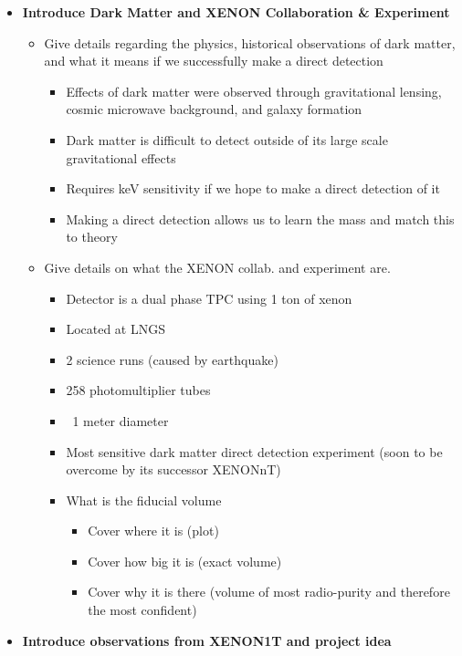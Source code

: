 \documentclass[12pt]{article}
\author{}
\date{}
\begin{document}
	\begin{itemize}
		\item \textbf{Introduce Dark Matter and XENON Collaboration \& Experiment}
			\begin{itemize}
				\item Give details regarding the physics, historical observations of dark matter, and what it means if we successfully make a direct detection
					\begin{itemize}
						\item Effects of dark matter were observed through gravitational lensing, cosmic microwave background, and galaxy formation
						\item Dark matter is difficult to detect outside of its large scale gravitational effects
						\item Requires keV sensitivity if we hope to make a direct detection of it
						\item Making a direct detection allows us to learn the mass and match this to theory
					\end{itemize}
				\item Give details on what the XENON collab. and experiment are.
					\begin{itemize}
						\item Detector is a dual phase TPC using 1 ton of xenon
						\item Located at LNGS
						\item 2 science runs (caused by earthquake)
						\item 258 photomultiplier tubes
						\item ~1 meter diameter
						\item Most sensitive dark matter direct detection experiment (soon to be overcome by its successor XENONnT)
						\item What is the fiducial volume
							\begin{itemize}
								\item Cover where it is (plot)
								\item Cover how big it is (exact volume)
								\item Cover why it is there (volume of most radio-purity and therefore the most confident)
							\end{itemize}
					\end{itemize}
			\end{itemize}
		\item \textbf{Introduce observations from XENON1T and project idea}
			\begin{itemize}

\end{itemize}
\end{itemize}
\end{document}
